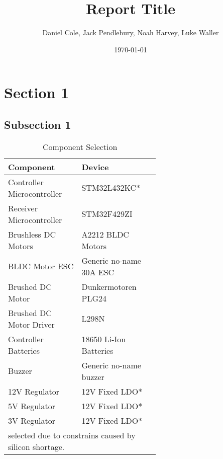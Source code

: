 \documentclass [12pt]{article}
\begin{document}
\title{\bf Report Title}
\author{Daniel Cole, Jack Pendlebury, Noah Harvey, Luke Waller}
\date{\today}
\maketitle
\thispagestyle{empty}

\newpage
{}
\setcounter{page}{1}
\tableofcontents
\newpage

\listoffigures
\listoftables

\newpage
\section{Section 1}\label{sec:section_1}

\subsection{Subsection 1}\label{sec:sub_section_1}

\cite{PRINCE2}


\begin{table}[H]
\centering
\setlength{\arrayrulewidth}{1.5pt}
\begin{tabular}{|p{0.3\linewidth}|p{0.3\linewidth}|}
\hline
\cellcolor{gray!40}Component & \cellcolor{gray!40}Device \\
\hline
Controller Microcontroller  & STM32L432KC* \\
\hline
Receiver Microcontroller   & STM32F429ZI\\
\hline
Brushless DC Motors   & A2212 BLDC Motors \\
\hline
BLDC Motor ESC   & Generic no-name 30A ESC\\
\hline
Brushed DC Motor   & Dunkermotoren PLG24 \\
\hline
Brushed DC Motor Driver  & L298N\\
\hline
Controller Batteries   & 18650 Li-Ion Batteries \\
\hline
Buzzer   & Generic no-name buzzer \\
\hline
12V Regulator & 12V Fixed LDO* \\
\hline
5V Regulator & 12V Fixed LDO*\\
\hline
3V Regulator & 12V Fixed LDO*\\
\hline
\multicolumn{2}{l}{\small *selected due to constrains caused by silicon shortage.} \\
\end{tabular}
\caption{Component Selection}
\label{table:component_selection}
\end{table}
\end{document}

